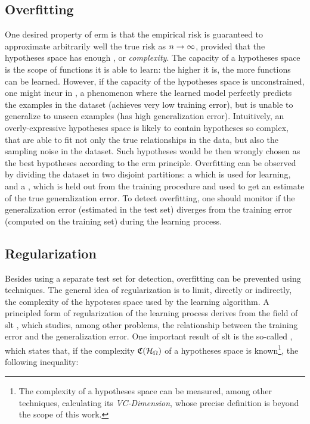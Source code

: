 \subsection{Overfitting}
One desired property of \gls{erm} is that the empirical risk is guaranteed to approximate arbitrarily well the true risk as $n \shortrightarrow \infty$, provided that the hypotheses space has enough , or \emph{complexity}. The capacity of a hypotheses space is the scope of functions it is able to learn: the higher it is, the more  functions can be learned. However, if the capacity of the hypotheses space is unconstrained, one might incur in , a phenomenon where the learned model perfectly predicts the examples in the dataset (achieves very low training error), but is unable to generalize to unseen examples (has high generalization error). Intuitively, an overly-expressive hypotheses space is likely to contain hypotheses so complex, that are able to fit not only the true relationships in the data, but also the sampling noise in the dataset. Such hypotheses would be then wrongly chosen as the best hypotheses according to the \gls{erm} principle. Overfitting can be observed by dividing the dataset in two disjoint partitions: a  which is used for learning, and a , which is held out from the training procedure and used to get an estimate of the true generalization error. To detect overfitting, one should monitor if the generalization error (estimated in the test set) diverges from the training error (computed on the training set) during the learning process.

\subsection{Regularization}
Besides using a separate test set for detection, overfitting can be prevented \apriori using  techniques. The general idea of regularization is to limit, directly or indirectly, the complexity of the hypoteses space used by the learning algorithm. A principled form of regularization of the learning process derives from the field of \gls{slt} \citep{vapnik2000slt}, which studies, among other problems, the relationship between the training error and the generalization error.  One important result of \gls{slt} is the so-called , which states that, if the complexity $\Complexity(\HypSpace)$ of a hypotheses space is known\footnote{The complexity of a hypotheses space can be measured, among other techniques, calculating its \emph{VC-Dimension}, whose precise definition is beyond the scope of this work.}, the following inequality:

